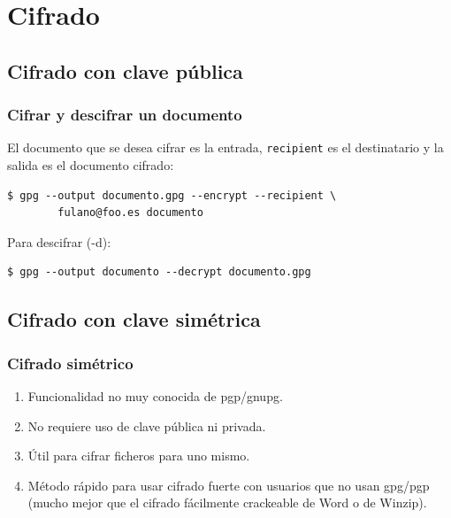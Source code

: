 \documentclass{beamer}
\begin{document}
\section{Cifrado}

\subsection{Cifrado con clave pública}

\begin{frame}[fragile]
\frametitle{Cifrar y descifrar un documento}

El documento que se desea cifrar es la entrada, \texttt{recipient} es el destinatario y la salida es el documento cifrado:



\begin{lstlisting}[frame=trBL]
$ gpg --output documento.gpg --encrypt --recipient \ 
        fulano@foo.es documento
\end{lstlisting}

\medskip

Para descifrar (-d):
\begin{lstlisting}[frame=trBL]
$ gpg --output documento --decrypt documento.gpg
\end{lstlisting}

\end{frame}




\subsection{Cifrado con clave simétrica}

\begin{frame}
\frametitle{Cifrado simétrico}

\begin{enumerate}
\item Funcionalidad no muy conocida de pgp/gnupg.
\item No requiere uso de clave pública ni privada.
\item Útil para cifrar ficheros para uno mismo.
\item Método rápido para usar \alert{cifrado fuerte} con usuarios que no usan gpg/pgp (mucho mejor que el cifrado fácilmente crackeable de Word o de Winzip).
\end{enumerate}

\end{frame}
\end{document}
